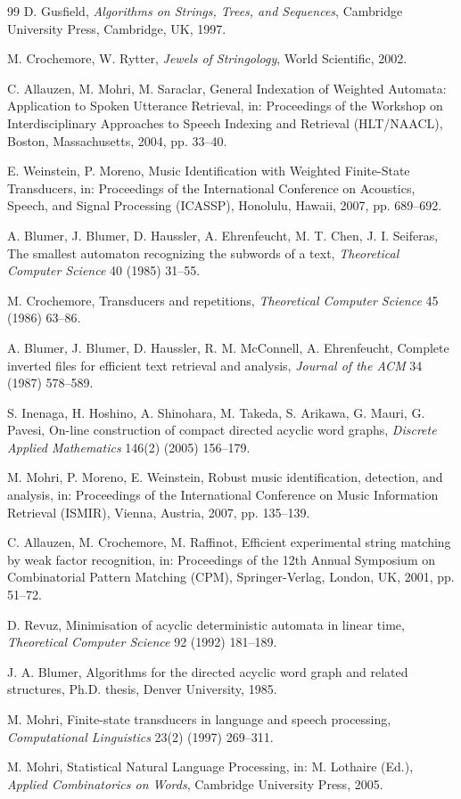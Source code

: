 \documentclass[11pt]{article}
\begin{document}
\begin{thebibliography}{99}
D. Gusfield, \textit{Algorithms on Strings, Trees, and Sequences}, Cambridge
University Press, Cambridge, UK, 1997.

M. Crochemore, W. Rytter, \textit{Jewels of Stringology}, World Scientific,
2002.

C. Allauzen, M. Mohri, M. Saraclar, General Indexation of Weighted Automata:
Application to Spoken Utterance Retrieval, in: Proceedings of the Workshop on
Interdisciplinary Approaches to Speech Indexing and Retrieval (HLT/NAACL),
Boston, Massachusetts, 2004, pp. 33--40.

E. Weinstein, P. Moreno, Music Identification with Weighted Finite-State
Transducers, in: Proceedings of the International Conference on Acoustics,
Speech, and Signal Processing (ICASSP), Honolulu, Hawaii, 2007, pp. 689--692.

A. Blumer, J. Blumer, D. Haussler, A. Ehrenfeucht, M. T. Chen, J. I. Seiferas,
The smallest automaton recognizing the subwords of a text, \textit{Theoretical
Computer Science} 40 (1985) 31--55.

M. Crochemore, Transducers and repetitions, \textit{Theoretical Computer
Science} 45 (1986) 63--86.

A. Blumer, J. Blumer, D. Haussler, R. M. McConnell, A. Ehrenfeucht, Complete
inverted files for efficient text retrieval and analysis, \textit{Journal of
the ACM} 34 (1987) 578--589.

S. Inenaga, H. Hoshino, A. Shinohara, M. Takeda, S. Arikawa, G. Mauri,
G. Pavesi, On-line construction of compact directed acyclic word graphs,
\textit{Discrete Applied Mathematics} 146(2) (2005) 156--179.

M. Mohri, P. Moreno, E. Weinstein, Robust music identification, detection, and
analysis, in: Proceedings of the International Conference on Music Information
Retrieval (ISMIR), Vienna, Austria, 2007, pp. 135--139.

C. Allauzen, M. Crochemore, M. Raffinot, Efficient experimental string matching
by weak factor recognition, in: Proceedings of the 12th Annual Symposium on
Combinatorial Pattern Matching (CPM), Springer-Verlag, London, UK, 2001,
pp. 51--72.

D. Revuz, Minimisation of acyclic deterministic automata in linear time,
\textit{Theoretical Computer Science} 92 (1992) 181--189.

J. A. Blumer, Algorithms for the directed acyclic word graph and related
structures, Ph.D. thesis, Denver University, 1985.

M. Mohri, Finite-state transducers in language and speech processing,
\textit{Computational Linguistics} 23(2) (1997) 269--311.

M. Mohri, Statistical Natural Language Processing, in: M. Lothaire (Ed.),
\textit{Applied Combinatorics on Words}, Cambridge University Press, 2005.
\end{thebibliography}
\end{document}
